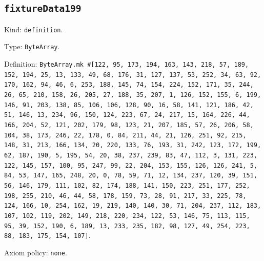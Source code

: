 \documentclass[11pt]{article}
\begin{document}
\subsection*{\texttt{fixtureData199}}
\noindent Kind: \texttt{definition}.\par
\noindent Type: \texttt{ByteArray}.\par
\noindent Definition: \texttt{ByteArray.mk \#[122, 95, 173, 194, 163, 143, 218, 57, 189, 152, 194, 25, 13, 133, 49, 68, 176, 31, 127, 137, 53, 252, 34, 63, 92, 170, 162, 94, 46, 6, 253, 188, 145, 74, 154, 224, 152, 171, 35, 244, 26, 65, 210, 158, 26, 205, 27, 188, 35, 207, 1, 126, 152, 155, 6, 199, 146, 91, 203, 138, 85, 106, 106, 128, 90, 16, 58, 141, 121, 186, 42, 51, 146, 13, 234, 96, 150, 124, 223, 67, 24, 217, 15, 164, 226, 44, 166, 204, 52, 121, 202, 179, 98, 123, 21, 207, 185, 57, 26, 206, 58, 104, 38, 173, 246, 22, 178, 0, 84, 211, 44, 21, 126, 251, 92, 215, 148, 31, 213, 166, 134, 20, 220, 133, 76, 193, 31, 242, 123, 172, 199, 62, 187, 190, 5, 195, 54, 20, 38, 237, 239, 83, 47, 112, 3, 131, 223, 122, 145, 157, 100, 95, 247, 99, 22, 204, 153, 155, 126, 126, 241, 5, 84, 53, 147, 165, 248, 20, 0, 78, 59, 71, 12, 134, 237, 120, 39, 151, 56, 146, 179, 111, 102, 82, 174, 188, 141, 150, 223, 251, 177, 252, 198, 255, 210, 46, 44, 58, 178, 159, 73, 28, 91, 217, 33, 225, 78, 124, 166, 10, 254, 162, 19, 219, 140, 140, 30, 71, 204, 237, 112, 183, 107, 102, 119, 202, 149, 218, 220, 234, 122, 53, 146, 75, 113, 115, 95, 39, 152, 190, 6, 189, 13, 233, 235, 182, 98, 127, 49, 254, 223, 88, 183, 175, 154, 107]}.\par
\noindent Axiom policy: \texttt{none}.\par
\end{document}
